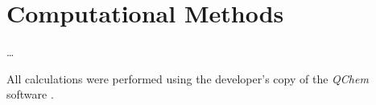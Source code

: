 \chapter{Computational Methods}\label{ch:methods}

\ldots

All calculations were performed using the developer's copy of the \textit{QChem} software \cite{QChem5}.
\instructionsappendices


\cleardoublepage

